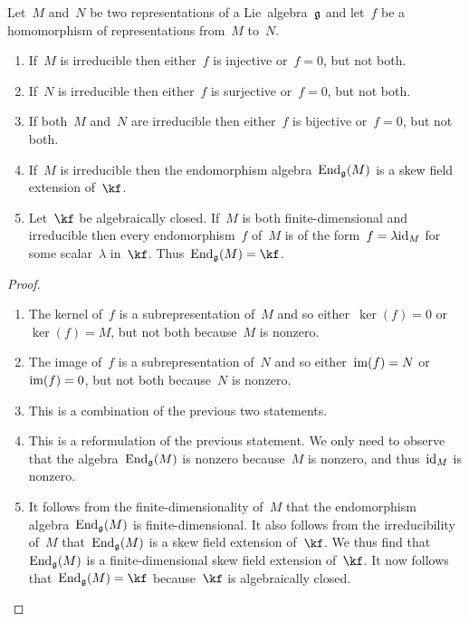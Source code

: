 \begin{proposition}[Schur]
  Let~$M$ and~$N$ be two representations of a Lie~algebra~$\mathfrak{g}$ and let~$f$ be a homomorphism of representations from~$M$ to~$N$.
  \begin{enumerate}
    \item
      If~$M$ is irreducible then either~$f$ is injective or~$f = 0$, but not both.
    \item
      If~$N$ is irreducible then either~$f$ is surjective or~$f = 0$, but not both.
    \item
      If both~$M$ and~$N$ are irreducible then either~$f$ is bijective or~$f = 0$, but not both.
    \item
      If~$M$ is irreducible then the endomorphism algebra~$\operatorname{End}_{\mathfrak{g}}(M)$ is a skew field extension of~$\kf$.
    \item
      Let~$\kf$ be algebraically closed.
      If~$M$ is both finite-dimensional and irreducible then every endomorphism~$f$ of~$M$ is of the form~$f = \lambda \mathrm{id}_M$ for some scalar~$\lambda$ in~$\kf$.
      Thus~$\End_{\glie}(M) = \kf$.
  \end{enumerate}
\end{proposition}


\begin{proof}
  \leavevmode
  \begin{enumerate}
    \item
      The kernel of~$f$ is a subrepresentation of~$M$ and so either~$\ker(f) = 0$ or~$\ker(f) = M$, but not both because~$M$ is nonzero.
    \item
      The image of~$f$ is a subrepresentation of~$N$ and so either~$\operatorname{im}(f) = N$ or~$\operatorname{im}(f) = 0$, but not both because~$N$ is nonzero.
    \item
      This is a combination of the previous two statements.
    \item
      This is a reformulation of the previous statement.
      We only need to observe that the algebra~$\operatorname{End}_{\mathfrak{g}}(M)$ is nonzero because~$M$ is nonzero, and thus~$\mathrm{id}_M$ is nonzero.
    \item
      It follows from the finite-dimensionality of~$M$ that the endomorphism algebra~$\operatorname{End}_{\mathfrak{g}}(M)$ is finite-dimensional.
      It also follows from the irreducibility of~$M$ that~$\operatorname{End}_{\mathfrak{g}}(M)$ is a skew field extension of~$\kf$.
      We thus find that~$\operatorname{End}_{\mathfrak{g}}(M)$ is a finite-dimensional skew field extension of~$\kf$.
      It now follows that~$\End_{\glie}(M) = \kf$ because~$\kf$ is algebraically closed.
    \qedhere
  \end{enumerate}
\end{proof}





